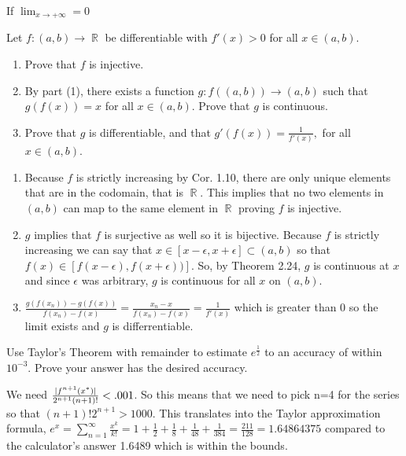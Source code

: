 \documentclass[12pt,letterpaper,boxed]{hmcpset}
\DeclareMathOperator{\R}{\mathbb{R}}
\DeclarePairedDelimiter\abs{\lvert}{\rvert}%
\begin{document}
\begin{solution}
If $\lim_{x \rightarrow +\infty} = 0$ 
\end{solution}

\begin{problem}[Exercise 1.12]
Let $f: (a,b) \rightarrow \R$ be differentiable with $f'(x) > 0$ for all $x\in(a,b)$.
\begin{enumerate}
    \item Prove that $f$ is injective.
    \item By part (1), there exists a function $g : f((a,b))\rightarrow (a,b)$ such that $g(f(x))= x$ for all $x\in(a, b).$ Prove that $g$ is continuous.
    \item Prove that $g$ is differentiable, and that $g'(f(x))= \frac{1}{f'(x)},$ for all $x \in (a,b)$.
\end{enumerate}
\end{problem}

\begin{solution}
\begin{enumerate}
    \item Because $f$ is strictly increasing by Cor. 1.10, there are only unique elements that are in the codomain, that is $\R$. This implies that no two elements in $(a,b)$ can map to the same element in $\R$ proving $f$ is injective.
    \item $g$ implies that $f$ is surjective as well so it is bijective. Because $f$ is strictly increasing we can say that $x \in [x - \epsilon, x + \epsilon]\subset (a,b)$ so that $f(x) \in [f(x - \epsilon), f(x + \epsilon))]$. So, by Theorem 2.24, $g$ is continuous at $x$ and since $\epsilon$ was arbitrary, $g$ is continuous for all $x$ on $(a,b)$. 
    \item $\frac{g(f(x_n)) - g(f(x))}{f(x_n) - f(x)} = \frac{x_n - x}{f(x_n) - f(x)} = \frac{1}{f'(x)}$ which is greater than 0 so the limit exists and $g$ is differrentiable. 
\end{enumerate}
\end{solution}

\begin{problem}[Exercise 1.17]
Use Taylor's Theorem with remainder to estimate $e^{\frac{1}{2}}$ to an accuracy of within $10^{-3}.$ Prove your answer has the desired accuracy.
\end{problem}

\begin{solution}
We need $\frac{\abs{f^{n+1}(x^{*})}}{2^{n + 1}(n + 1)!} < .001$. So this means that we need to pick n=4 for the series so that $(n + 1)!2^{n + 1} > 1000$. This translates into the Taylor approximation formula, $e^{x}=\sum_{n=1}^{\infty} \frac{x^{k}}{k!} = 1 + \frac{1}{2} + \frac{1}{8} + \frac{1}{48} + \frac{1}{384} = \frac{211}{128}=1.64864375$ compared to the calculator's answer 1.6489 which is within the bounds.
\end{solution}
\end{document}
